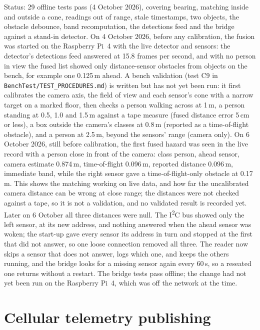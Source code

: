 Status: 29 offline tests pass (4 October 2026), covering bearing, matching inside and outside a cone, readings out of range, stale timestamps, two objects, the obstacle debounce, band recomputation, the detections feed and the bridge against a stand-in detector. On 4 October 2026, before any calibration, the fusion was started on the Raspberry Pi~4 with the live detector and sensors: the detector's detections feed answered at 15.8 frames per second, and with no person in view the fused list showed only distance-sensor obstacles from objects on the bench, for example one 0.125\,m ahead. A bench validation (test C9 in \texttt{BenchTest/\allowbreak TEST\_PROCEDURES.md}) is written but has not yet been run: it first calibrates the camera axis, the field of view and each sensor's cone with a narrow target on a marked floor, then checks a person walking across at 1\,m, a person standing at 0.5, 1.0 and 1.5\,m against a tape measure (fused distance error 5\,cm or less), a box outside the camera's classes at 0.8\,m (reported as a time-of-flight obstacle), and a person at 2.5\,m, beyond the sensors' range (camera only). On 6 October 2026, still before calibration, the first fused hazard was seen in the live record with a person close in front of the camera: class person, ahead sensor, camera estimate 0.874\,m, time-of-flight 0.096\,m, reported distance 0.096\,m, immediate band, while the right sensor gave a time-of-flight-only obstacle at 0.17\,m. This shows the matching working on live data, and how far the uncalibrated camera distance can be wrong at close range; the distances were not checked against a tape, so it is not a validation, and no validated result is recorded yet. Later on 6 October all three distances were null. The I\textsuperscript{2}C bus showed only the left sensor, at its new address, and nothing answered when the ahead sensor was woken; the start-up gave every sensor its address in turn and stopped at the first that did not answer, so one loose connection removed all three. The reader now skips a sensor that does not answer, logs which one, and keeps the others running, and the bridge looks for a missing sensor again every 60\,s, so a reseated one returns without a restart. The bridge tests pass offline; the change had not yet been run on the Raspberry Pi~4, which was off the network at the time.

\section{Cellular telemetry publishing}
\label{sec:mqtt-networking}

